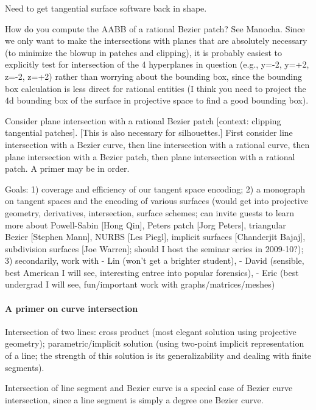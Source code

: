\documentclass[11pt]{article}
\begin{document}
Need to get tangential surface software back in shape.

How do you compute the AABB of a rational Bezier patch? See Manocha.
Since we only want to make the intersections with planes that are absolutely necessary
(to minimize the blowup in patches and clipping), it is probably easiest to explicitly
test for intersection of the 4 hyperplanes in question (e.g., y=-2, y=+2, z=-2, z=+2)
rather than worrying about the bounding box, since the bounding box calculation is
less direct for rational entities (I think you need to project the 4d bounding box of
the surface in projective space to find a good bounding box).

Consider plane intersection with a rational Bezier patch [context: clipping tangential patches].
[This is also necessary for silhouettes.]
First consider line intersection with a Bezier curve, then line intersection with a rational curve,
then plane intersection with a Bezier patch, then plane intersection with a rational patch.
A primer may be in order.

Goals: 1) coverage and efficiency of our tangent space encoding;
       2) a monograph on tangent spaces and the encoding of various surfaces
          (would get into projective geometry, derivatives, intersection, surface schemes;
          can invite guests to learn more about Powell-Sabin [Hong Qin], Peters patch [Jorg Peters], 
          triangular Bezier [Stephen Mann], NURBS [Les Piegl], implicit surfaces [Chanderjit Bajaj],
          subdivision surfaces [Joe Warren]; should I host the seminar series in 2009-10?);
       3) secondarily, work with 
          - Lin (won't get a brighter student),
          - David (sensible, best American I will see, interesting entree into popular forensics),
          - Eric (best undergrad I will see, fun/important work with graphs/matrices/meshes)

\paragraph{A primer on curve intersection}

Intersection of two lines: cross product (most elegant solution using projective geometry);
parametric/implicit solution (using two-point implicit representation of a line; the strength
of this solution is its generalizability and dealing with finite segments).

Intersection of line segment and Bezier curve is a special case of Bezier curve intersection,
since a line segment is simply a degree one Bezier curve.
\end{document}
